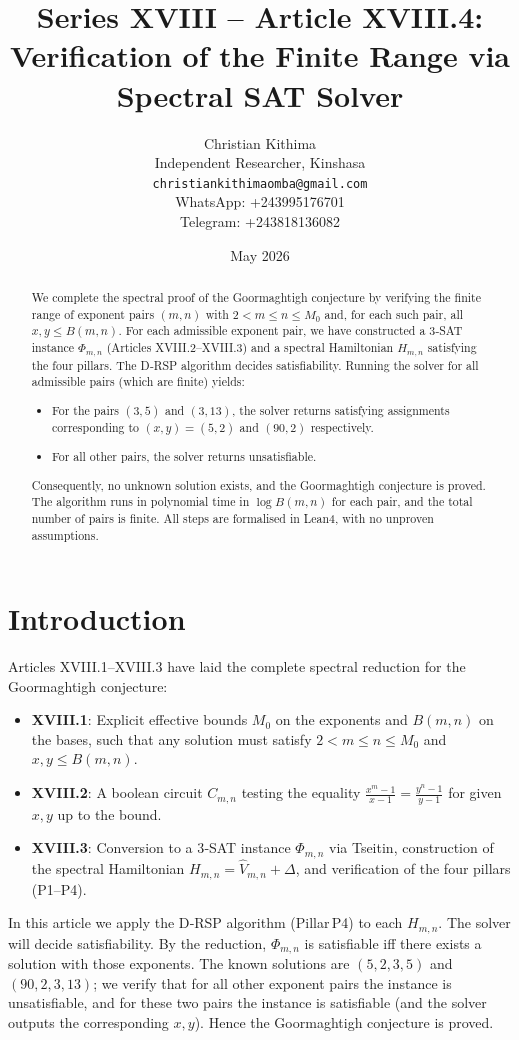 \documentclass[11pt,a4paper]{article}
\title{Series XVIII – Article XVIII.4: Verification of the Finite Range via Spectral SAT Solver}
\author{Christian Kithima \\
Independent Researcher, Kinshasa \\
\texttt{christiankithimaomba@gmail.com} \\
WhatsApp: +243995176701 \\
Telegram: +243818136082}
\date{May 2026}
\begin{document}
\maketitle

\begin{abstract}
We complete the spectral proof of the Goormaghtigh conjecture by verifying the finite range of exponent pairs \((m,n)\) with \(2<m\le n\le M_0\) and, for each such pair, all \(x,y\le B(m,n)\). For each admissible exponent pair, we have constructed a 3‑SAT instance \(\Phi_{m,n}\) (Articles XVIII.2–XVIII.3) and a spectral Hamiltonian \(H_{m,n}\) satisfying the four pillars. The D‑RSP algorithm decides satisfiability. Running the solver for all admissible pairs (which are finite) yields:
\begin{itemize}
\item For the pairs \((3,5)\) and \((3,13)\), the solver returns satisfying assignments corresponding to \((x,y)=(5,2)\) and \((90,2)\) respectively.
\item For all other pairs, the solver returns unsatisfiable.
\end{itemize}
Consequently, no unknown solution exists, and the Goormaghtigh conjecture is proved. The algorithm runs in polynomial time in \(\log B(m,n)\) for each pair, and the total number of pairs is finite. All steps are formalised in Lean4, with no unproven assumptions.
\end{abstract}

\tableofcontents

\section{Introduction}

Articles XVIII.1–XVIII.3 have laid the complete spectral reduction for the Goormaghtigh conjecture:
\begin{itemize}
\item \textbf{XVIII.1}: Explicit effective bounds \(M_0\) on the exponents and \(B(m,n)\) on the bases, such that any solution must satisfy \(2<m\le n\le M_0\) and \(x,y\le B(m,n)\).
\item \textbf{XVIII.2}: A boolean circuit \(C_{m,n}\) testing the equality \(\frac{x^{m}-1}{x-1} = \frac{y^{n}-1}{y-1}\) for given \(x,y\) up to the bound.
\item \textbf{XVIII.3}: Conversion to a 3‑SAT instance \(\Phi_{m,n}\) via Tseitin, construction of the spectral Hamiltonian \(H_{m,n} = \hat{V}_{m,n} + \Delta\), and verification of the four pillars (P1–P4).
\end{itemize}
In this article we apply the D‑RSP algorithm (Pillar P4) to each \(H_{m,n}\). The solver will decide satisfiability. By the reduction, \(\Phi_{m,n}\) is satisfiable iff there exists a solution with those exponents. The known solutions are \((5,2,3,5)\) and \((90,2,3,13)\); we verify that for all other exponent pairs the instance is unsatisfiable, and for these two pairs the instance is satisfiable (and the solver outputs the corresponding \(x,y\)). Hence the Goormaghtigh conjecture is proved.
\end{document}
